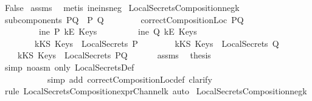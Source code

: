 \begin{isabellebody}
\ {\isachardoublequoteopen}False{\isachardoublequoteclose}\isanewline
%
\isadelimproof
%
\endisadelimproof
%
\isatagproof
{}\isamarkupfalse%
\ assms\ \isamarkupfalse%
\ {\isacharparenleft}metis\ ine{\isacharunderscore}ins{\isacharunderscore}neg{}{\isacharparenright}%
\endisatagproof
{\isafoldproof}%
%
\isadelimproof
\isanewline
%
\endisadelimproof
\isanewline
{}\isamarkupfalse%
\ LocalSecretsComposition{\isacharunderscore}neg{}{\isacharunderscore}k{\isacharcolon}\isanewline
{}\ {\isachardoublequoteopen}subcomponents\ PQ\ {\isacharequal}\ {\isacharbraceleft}P{\isacharcomma}\ Q{\isacharbraceright}{\isachardoublequoteclose}\isanewline
\ \ \ \ \ \ \ \ {\isachardoublequoteopen}correctCompositionLoc\ PQ{\isachardoublequoteclose}\isanewline
\ \ \ \ \ \ \ \ {\isachardoublequoteopen}{\isasymnot}\ ine\ P\ {\isacharparenleft}kE\ Keys{\isacharparenright}{\isachardoublequoteclose}\isanewline
\ \ \ \ \ \ \ \ {\isachardoublequoteopen}{\isasymnot}\ ine\ Q\ {\isacharparenleft}kE\ Keys{\isacharparenright}{\isachardoublequoteclose}\isanewline
\ \ \ \ \ \ \ \ {\isachardoublequoteopen}kKS\ Keys\ {\isasymnotin}\ LocalSecrets\ P{\isachardoublequoteclose}\isanewline
\ \ \ \ \ \ \ \ {\isachardoublequoteopen}kKS\ Keys\ {\isasymnotin}\ LocalSecrets\ Q{\isachardoublequoteclose}\isanewline
{}\ \ \ \ {\isachardoublequoteopen}kKS\ Keys\ {\isasymnotin}\ LocalSecrets\ PQ{\isachardoublequoteclose}\isanewline
%
\isadelimproof
%
\endisadelimproof
%
\isatagproof
{}\isamarkupfalse%
\ {\isacharminus}\ \isanewline
\ \ \isamarkupfalse%
\ assms\ \isamarkupfalse%
\ {\isacharquery}thesis\ \isanewline
\ \ \ \ \isamarkupfalse%
\ {\isacharparenleft}simp\ {\isacharparenleft}no{\isacharunderscore}asm{\isacharparenright}\ only{\isacharcolon}\ LocalSecretsDef{\isacharcomma}\ \isanewline
\ \ \ \ \ \ \ \ \ \ \ simp\ add{\isacharcolon}\ correctCompositionLoc{\isacharunderscore}def{\isacharcomma}\ clarify{\isacharparenright}\isanewline
\ \ \ \ \isamarkupfalse%
\ {\isacharparenleft}rule\ LocalSecretsComposition{\isacharunderscore}exprChannel{\isacharunderscore}k{\isacharcomma}\ auto{\isacharparenright}\isanewline
{}\isamarkupfalse%
%
\endisatagproof
{\isafoldproof}%
%
\isadelimproof
\isanewline
%
\endisadelimproof
\isanewline
{}\isamarkupfalse%
\ LocalSecretsComposition{\isacharunderscore}neg{\isacharunderscore}k{\isacharcolon}\isanewline

\end{isabellebody}
